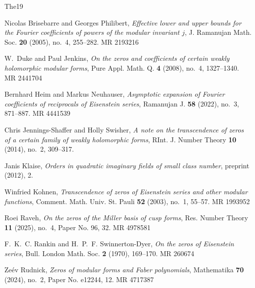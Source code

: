 \documentclass[12pt]{amsart}
\theoremstyle{plain} %
\theoremstyle{definition}
\theoremstyle{remark}
\numberwithin{equation}{section}
\begin{document}
% 
% 

\providecommand{\bysame}{\leavevmode\hbox to3em{\hrulefill}\thinspace}
\providecommand{\MR}{\relax\ifhmode\unskip\space\fi MR }
\providecommand{\MRhref}[2]{%
  \href{http://www.ams.org/mathscinet-getitem?mr=#1}{#2}
}
\providecommand{\href}[2]{#2}
\begin{thebibliography}{{The}19}

Nicolas Brisebarre and Georges Philibert, \emph{Effective lower and upper
  bounds for the {F}ourier coefficients of powers of the modular invariant
  {$j$}}, J. Ramanujan Math. Soc. \textbf{20} (2005), no.~4, 255--282.
  \MR{2193216}

W.~Duke and Paul Jenkins, \emph{On the zeros and coefficients of certain weakly
  holomorphic modular forms}, Pure Appl. Math. Q. \textbf{4} (2008), no.~4,
  1327--1340. \MR{2441704}

Bernhard Heim and Markus Neuhauser, \emph{Asymptotic expansion of {F}ourier
  coefficients of reciprocals of {E}isenstein series}, Ramanujan J. \textbf{58}
  (2022), no.~3, 871--887. \MR{4441539}

Chris Jennings-Shaffer and Holly Swisher, \emph{A note on the transcendence of
  zeros of a certain family of weakly holomorphic forms}, RInt. J. Number
  Theory \textbf{10} (2014), no.~2, 309--317.

Janis Klaise, \emph{Orders in quadratic imaginary fields of small class
  number}, preprint (2012), 2.

Winfried Kohnen, \emph{Transcendence of zeros of {E}isenstein series and other
  modular functions}, Comment. Math. Univ. St. Pauli \textbf{52} (2003), no.~1,
  55--57. \MR{1993952}

Roei Raveh, \emph{On the zeros of the {M}iller basis of cusp forms}, Res.
  Number Theory \textbf{11} (2025), no.~4, Paper No. 96, 32. \MR{4978581}

F.~K.~C. Rankin and H.~P.~F. Swinnerton-Dyer, \emph{On the zeros of
  {E}isenstein series}, Bull. London Math. Soc. \textbf{2} (1970), 169--170.
  \MR{260674}

Ze\'ev Rudnick, \emph{Zeros of modular forms and {F}aber polynomials},
  Mathematika \textbf{70} (2024), no.~2, Paper No. e12244, 12. \MR{4717387}


\end{thebibliography}
\end{document}
